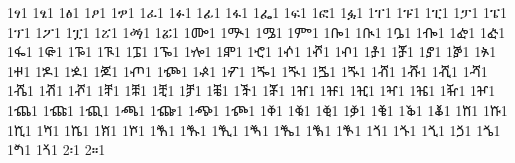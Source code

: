 {1ፃ1 %
1ፄ1 %
1ፅ1 %
1ፆ1 %
1ፇ1 %
1ፈ1 %
1ፉ1 %
1ፊ1 %
1ፋ1 %
1ፌ1 %
1ፍ1 %
1ፎ1 %
1ፏ1 %
1ፐ1 %
1ፑ1 %
1ፒ1 %
1ፓ1 %
1ፔ1 %
1ፕ1 %
1ፖ1 %
1ፗ1 %
1ፘ1 %
1ፙ1 %
1ፚ1 %
1ᎀ1 %
1ᎁ1 %
1ᎂ1 %
1ᎃ1 %
1ᎄ1 %
1ᎅ1 %
1ᎆ1 %
1ᎇ1 %
1ᎈ1 %
1ᎉ1 %
1ᎊ1 %
1ᎋ1 %
1ᎌ1 %
1ᎍ1 %
1ᎎ1 %
1ᎏ1 %
1ⶀ1 %
1ⶁ1 %
1ⶂ1 %
1ⶃ1 %
1ⶄ1 %
1ⶅ1 %
1ⶆ1 %
1ⶇ1 %
1ⶈ1 %
1ⶉ1 %
1ⶊ1 %
1ⶋ1 %
1ⶌ1 %
1ⶍ1 %
1ⶎ1 %
1ⶏ1 %
1ⶐ1 %
1ⶑ1 %
1ⶒ1 %
1ⶓ1 %
1ⶔ1 %
1ⶕ1 %
1ⶖ1 %
1ⶠ1 %
1ⶡ1 %
1ⶢ1 %
1ⶣ1 %
1ⶤ1 %
1ⶥ1 %
1ⶦ1 %
1ⶨ1 %
1ⶩ1 %
1ⶪ1 %
1ⶫ1 %
1ⶬ1 %
1ⶭ1 %
1ⶮ1 %
1ⶰ1 %
1ⶱ1 %
1ⶲ1 %
1ⶳ1 %
1ⶴ1 %
1ⶵ1 %
1ⶶ1 %
1ⶸ1 %
1ⶹ1 %
1ⶺ1 %
1ⶻ1 %
1ⶼ1 %
1ⶽ1 %
1ⶾ1 %
1ⷀ1 %
1ⷁ1 %
1ⷂ1 %
1ⷃ1 %
1ⷄ1 %
1ⷅ1 %
1ⷆ1 %
1ⷈ1 %
1ⷉ1 %
1ⷊ1 %
1ⷋ1 %
1ⷌ1 %
1ⷍ1 %
1ⷎ1 %
1ⷐ1 %
1ⷑ1 %
1ⷒ1 %
1ⷓ1 %
1ⷔ1 %
1ⷕ1 %
1ⷖ1 %
1ⷘ1 %
1ⷙ1 %
1ⷚ1 %
1ⷛ1 %
1ⷜ1 %
1ⷝ1 %
1ⷞ1 %
2፡1 %
2።1 %
}